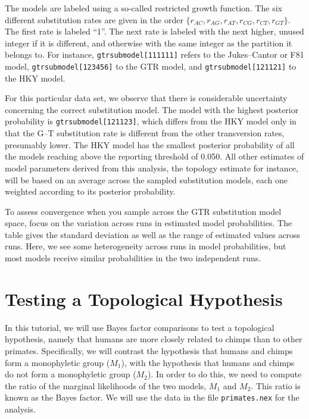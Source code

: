 \documentclass[12pt]{book}
\begin{document}
The models are labeled using a so-called restricted growth function. The six different substitution rates are
given in the order $\{r_{AC},r_{AG},r_{AT},r_{CG},r_{CT},r_{GT}\}$. The first rate is labeled ``1''. The 
next rate is labeled with the next higher, unused integer if it is different, and otherwise with the same integer as the
partition it belongs to. For instance, \texttt{gtrsubmodel[111111]} refers to the Jukes--Cantor or F81 model,
\texttt{gtrsubmodel[123456]} to the GTR model, and \texttt{gtrsubmodel[121121]} to the HKY model.

For this particular data set, we observe that there is considerable uncertainty concerning the correct
substitution model. The model with the highest posterior probability is \texttt{gtrsubmodel[121123]}, which differs
from the HKY model only in that the G--T substitution rate is different from the other transversion rates,
presumably lower. The HKY model has the smallest posterior probability of all the models
reaching above the reporting threshold of 0.050. All other estimates of model parameters derived from this
analysis, the topology estimate for instance, will be based on an average across the sampled substitution models,
each one weighted according to its posterior probability.

To assess convergence when you sample across the GTR substitution model space, focus on the variation
across runs in estimated model probabilities. The table gives the standard deviation as well as the range
of estimated values across runs. Here, we see some heterogeneity across runs in model probabilities, but
most models receive similar probabilities in the two independent runs.

\section{Testing a Topological Hypothesis}

In this tutorial, we will use Bayes factor comparisons to test a topological hypothesis, namely that humans are more closely related to chimps than to other primates. Specifically, we will contrast the hypothesis that humans and chimps form
a monophyletic group ($M_1$), with the hypothesis that humans and chimps do not form a monophyletic group ($M_2$).
In order to do this, we need to compute the ratio of the marginal likelihoods of the two models, $M_1$ and $M_2$.
This ratio is known as the Bayes factor. We will use the data in the file \texttt{primates.nex} for the analysis.
\end{document}

